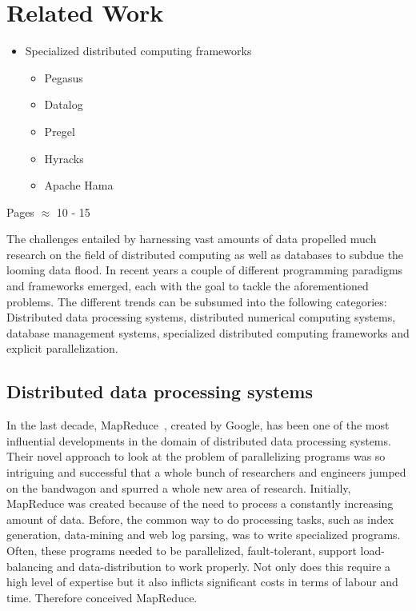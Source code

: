 \chapter{Related Work}
\label{cha:relatedwork}


\begin{itemize}
	\item Specialized distributed computing frameworks
	\begin{itemize}
		\item Pegasus
		\item Datalog
		\item Pregel
		\item Hyracks
		\item Apache Hama
	\end{itemize}
\end{itemize}

Pages $\approx$ 10 - 15

The challenges entailed by harnessing vast amounts of data propelled much research on the field of distributed computing as well as databases to subdue the looming data flood.
In recent years a couple of different programming paradigms and frameworks emerged, each with the goal to tackle the aforementioned problems.
The different trends can be subsumed into the following categories: Distributed data processing systems, distributed numerical computing systems, database management systems, specialized distributed computing frameworks and explicit parallelization.

\section{Distributed data processing systems}

In the last decade, MapReduce~\cite{dean:c2008a}, created by Google, has been one of the most influential developments in the domain of distributed data processing systems.
Their novel approach to look at the problem of parallelizing programs was so intriguing and successful that a whole bunch of researchers and engineers jumped on the bandwagon and spurred a whole new area of research.
Initially, MapReduce was created because of the need to process a constantly increasing amount of data.
Before, the common way to do processing tasks, such as index generation, data-mining and web log parsing, was to write specialized programs.
Often, these programs needed to be parallelized, fault-tolerant, support load-balancing and data-distribution to work properly.
Not only does this require a high level of expertise but it also inflicts significant costs in terms of labour and time.
Therefore \citeauthor{dean:c2008a} conceived MapReduce.

